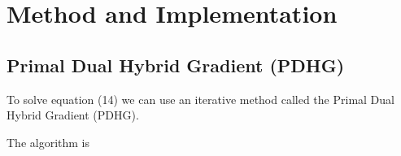 \documentclass[12pt]{article}
\begin{document}

    
    
    




\section{Method and Implementation}



\subsection{Primal Dual Hybrid Gradient (PDHG)}

To solve equation
(14) 
we can use an iterative method called the Primal Dual Hybrid Gradient (PDHG). 

The algorithm is
\end{document}
